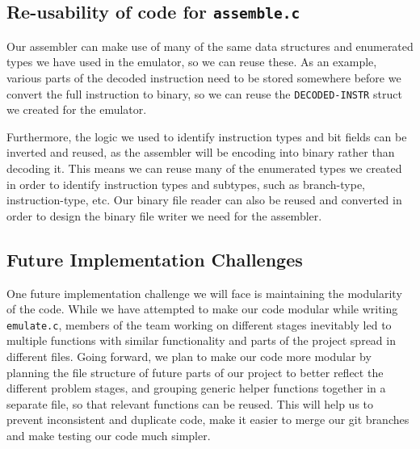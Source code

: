 \documentclass[11pt]{article}
\begin{document}
\subsection{Re-usability of code for \texttt{assemble.c}}
Our assembler can make use of many of the same data structures and enumerated types we have used in the emulator, so we can reuse these. As an example, various parts of the decoded instruction need to be stored somewhere before we convert the full instruction to binary, so we can reuse the \texttt{DECODED-INSTR} struct we created for the emulator. 

Furthermore, the logic we used to identify instruction types and bit fields can be inverted and reused, as the assembler will be encoding into binary rather than decoding it. This means we can reuse many of the enumerated types we created in order to identify instruction types and subtypes, such as branch-type, instruction-type, etc. Our binary file reader can also be reused and converted in order to design the binary file writer we need for the assembler.

\subsection{Future Implementation Challenges}
One future implementation challenge we will face is maintaining the modularity of the code. While we have attempted to make our code modular while writing \texttt{emulate.c}, members of the team working on different stages inevitably led to multiple functions with similar functionality and parts of the project spread in different files. Going forward, we plan to make our code more modular by planning the file structure of future parts of our project to better reflect the different problem stages, and grouping generic helper functions together in a separate file, so that relevant functions can be reused. This will help us to prevent inconsistent and duplicate code, make it easier to merge our git branches and make testing our code much simpler.
\end{document}
